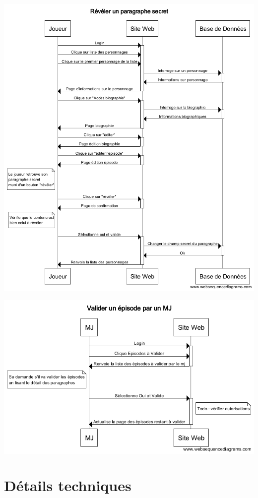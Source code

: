 \documentclass[a4paper, 11pt, titlepage]{article}
\begin{document}
\begin{center}
\includegraphics[scale=0.55]{sequence/RevelerParagraphe.png}
\end{center}

\begin{center}
\includegraphics[scale=0.55]{sequence/ValiderEpisodeParMJ.png}
\end{center}


\section {Détails techniques}
\end{document}
